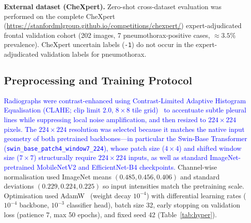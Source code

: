 \documentclass[diagnostics,article,submit,moreauthors]{Definitions/mdpi}
\newcommand{\rev}[1]{\textcolor{blue}{#1}}
\begin{document}
\textbf{External dataset (CheXpert).} Zero-shot cross-dataset evaluation was performed on the complete CheXpert~\cite{irvin2019chexpert} (\url{https://stanfordmlgroup.github.io/competitions/chexpert/}) expert-adjudicated frontal validation cohort (202 images, 7 pneumothorax-positive cases, $\approx 3.5\%$ prevalence). CheXpert uncertain labels (\texttt{-1}) do not occur in the expert-adjudicated validation labels for pneumothorax.

\subsection{Preprocessing and Training Protocol}

\rev{Radiographs were contrast-enhanced using Contrast-Limited Adaptive Histogram Equalisation (CLAHE; clip limit $2.0$, $8\times 8$ tile grid)~\cite{zuiderveld1994contrast} to accentuate subtle pleural lines while suppressing local noise amplification, and then resized to $224\times 224$ pixels. The $224\times 224$ resolution was selected because it matches the native input geometry of both pretrained backbones---in particular the Swin-Base Transformer (\texttt{swin\_base\_patch4\_window7\_224}), whose patch size ($4\times 4$) and shifted window size ($7\times 7$) structurally require $224\times 224$ inputs, as well as standard ImageNet-pretrained MobileNetV2 and EfficientNet-B4 checkpoints.} Channel-wise normalisation used ImageNet means $(0.485, 0.456, 0.406)$ and standard deviations $(0.229, 0.224, 0.225)$ so input intensities match the pretraining scale. Optimisation used AdamW~\cite{loshchilov2019decoupled} (weight decay $10^{-4}$) with differential learning rates ($10^{-4}$ backbone, $10^{-3}$ classifier head), batch size 32, early stopping on validation loss (patience 7, max 50 epochs), and fixed seed 42 (Table~\ref{tab:hyper}).
\end{document}

